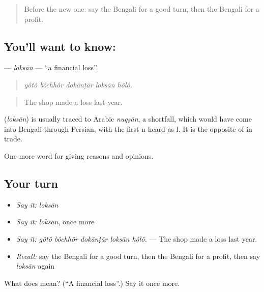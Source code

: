 \begin{quote}
Before the new one: say the Bengali for a good turn, then the Bengali for a profit.
\end{quote}

\subsection*{You'll want to know: }
\textbf{} — \emph{loksān} — \textquotedblleft{}a financial loss\textquotedblright{}.

\begin{quote}
    
\end{quote}

\begin{quote}
\emph{gôtô bôchhôr dokānṭār loksān hôlô.}
\end{quote}

\begin{quote}
The shop made a loss last year.
\end{quote}

\begin{cousinweb}
\textbf{} (\emph{loksān}) is usually traced to Arabic \emph{nuqṣān}, a shortfall, which would have come into Bengali through Persian, with the first n heard as l. It is the opposite of  in trade.
\end{cousinweb}

\begin{grammarlens}[title={What you've built}]
One more word for giving reasons and opinions.
\end{grammarlens}

\subsection*{Your turn}
\begin{itemize}
\raggedright
  \item \emph{Say it:} \emph{loksān}
  \item \emph{Say it:} \emph{loksān}, once more
  \item \emph{Say it:} \emph{gôtô bôchhôr dokānṭār loksān hôlô.} — The shop made a loss last year.
  \item \emph{Recall:} say the Bengali for a good turn, then the Bengali for a profit, then say \emph{loksān} again
\end{itemize}

\begin{tcolorbox}[breakable,colback=teal!4,colframe=teal!35!black,title={Before you move on}]
What does  mean? (\textquotedblleft{}A financial loss\textquotedblright{}.) Say it once more.
\end{tcolorbox}
